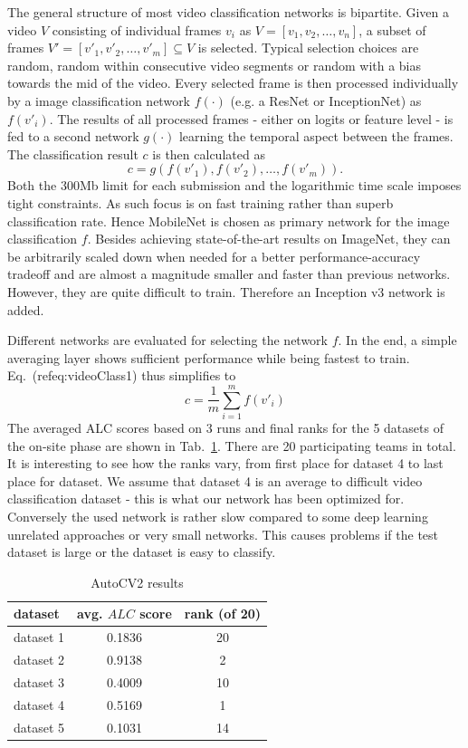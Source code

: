\documentclass{article}
\begin{document}
The general structure of most video classification networks is bipartite. Given a video $V$ consisting of individual frames $v_i$ as $V = [v_1, v_2, \ldots, v_n]$, a subset of frames $V' = [v'_1, v'_2, \ldots, v'_m] \subseteq V$ is selected. Typical selection choices are random, random within consecutive video segments or random with a bias towards the mid of the video. Every selected frame is then processed individually by a image classification network $f(\cdot)$ (e.g. a ResNet or InceptionNet) as $f(v'_i)$. The results of all processed frames - either on logits or feature level - is fed to a second network $g(\cdot)$ learning the temporal aspect between the frames. The classification result $c$ is then calculated as 
%
\begin{equation}
c = g\left(f(v'_1), f(v'_2), \ldots, f(v'_m) \right).
\label{eq:videoClass1}
\end{equation}
%
Both the 300Mb limit for each submission and the logarithmic time scale imposes tight constraints. As such focus is on fast training rather than superb classification rate. Hence MobileNet is chosen as primary network for the image classification $f$. Besides achieving state-of-the-art results on ImageNet, they can be arbitrarily scaled down when needed for a better performance-accuracy tradeoff and are almost a magnitude smaller and faster than previous networks. However, they are quite difficult to train. Therefore an Inception v3 network is added.

Different networks are evaluated for selecting the network $f$. In the end, a simple averaging layer shows sufficient performance while being fastest to train. Eq.~(ref{eq:videoClass1}) thus simplifies to 
%
\begin{equation}
c = \frac{1}{m}\sum\limits_{i=1}^m f(v'_i)
\label{eq:videoClass2}
\end{equation}
%
The averaged ALC scores based on 3 runs and final ranks for the 5 datasets of the on-site phase are shown in Tab.~\ref{table:autocv2}. There are 20 participating teams in total. It is interesting to see how the ranks vary, from first place for dataset 4 to last place for dataset. We assume that dataset 4 is an average to difficult video classification dataset - this is what our network has been optimized for. Conversely the used network is rather slow compared to some deep learning unrelated approaches or very small networks. This causes problems if the test dataset is large or the dataset is easy to classify. 
%
\begin{table}
\center
\begin{tabular}{|l|c|c|}
\hline
dataset & avg. $ALC$ score & rank (of 20) \\
\hline
dataset 1 & 0.1836 & 20 \\
dataset 2 & 0.9138 & 2  \\
dataset 3 & 0.4009 & 10 \\
dataset 4 & 0.5169 & 1  \\
dataset 5 & 0.1031 & 14 \\
\hline
\end{tabular}
\normalsize
\caption{AutoCV2 results}
\label{table:autocv2}
\end{table}
\end{document}
